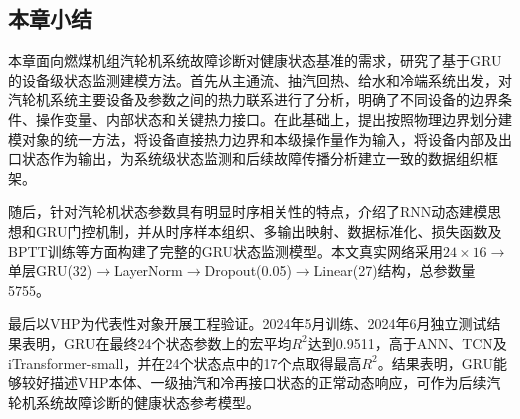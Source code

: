 \subsection{本章小结}

本章面向燃煤机组汽轮机系统故障诊断对健康状态基准的需求，研究了基于GRU的设备级状态监测建模方法。首先从主通流、抽汽回热、给水和冷端系统出发，对汽轮机系统主要设备及参数之间的热力联系进行了分析，明确了不同设备的边界条件、操作变量、内部状态和关键热力接口。在此基础上，提出按照物理边界划分建模对象的统一方法，将设备直接热力边界和本级操作量作为输入，将设备内部及出口状态作为输出，为系统级状态监测和后续故障传播分析建立一致的数据组织框架。

随后，针对汽轮机状态参数具有明显时序相关性的特点，介绍了RNN动态建模思想和GRU门控机制，并从时序样本组织、多输出映射、数据标准化、损失函数及BPTT训练等方面构建了完整的GRU状态监测模型。本文真实网络采用$24\times16\rightarrow$单层GRU(32)$\rightarrow$LayerNorm$\rightarrow$Dropout(0.05)$\rightarrow$Linear(27)结构，总参数量5755。

最后以VHP为代表性对象开展工程验证。2024年5月训练、2024年6月独立测试结果表明，GRU在最终24个状态参数上的宏平均$R^2$达到0.9511，高于ANN、TCN及iTransformer-small，并在24个状态点中的17个点取得最高$R^2$。结果表明，GRU能够较好描述VHP本体、一级抽汽和冷再接口状态的正常动态响应，可作为后续汽轮机系统故障诊断的健康状态参考模型。